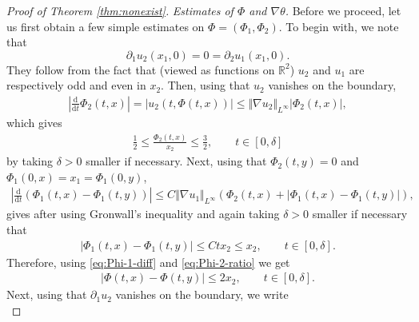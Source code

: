 \documentclass[10pt]{amsart}
\theoremstyle{definition}
\theoremstyle{remark}
\numberwithin{equation}{section}
\newcommand{\nrm}[1]{\Vert#1\Vert}
\newcommand{\ud}{\mathrm{d}}
\newcommand{\rd}{\partial}
\newcommand{\nb}{\nabla}
\newcommand{\0}{\emptyset}
\newcommand{\dlt}{\delta}
\newcommand{\tht}{\theta}
\newcommand{\bbR}{\mathbb R}
\begin{document}
\begin{proof}[Proof of Theorem \ref{thm:nonexist}]
			\noindent \textit{Estimates of $\Phi$ and $\nb\tht$.} Before we proceed, let us first obtain a few simple estimates on $\Phi = (\Phi_1,\Phi_2)$. To begin with, we note that $$\partial_1u_2 (x_1,0) = 0 = \partial_2 u_1(x_1,0) .$$ They follow from the fact that (viewed as functions on $\bbR^{2}$) $u_2$ and $u_1$ are respectively odd and even in $x_{2}$. Then, using that $u_{2}$ vanishes on the boundary, \begin{equation*}
				\begin{split}
					\left| \frac{\ud}{\ud t} \Phi_{2}(t,x) \right| = \left| u_{2}(t,\Phi(t,x)) \right| \le \nrm{\nb u_{2}}_{L^\infty} \left| \Phi_{2}(t,x) \right|,
				\end{split}
			\end{equation*} which gives \begin{equation}\label{eq:Phi-2-ratio}
				\begin{split}
					\frac12 \le \frac{\Phi_{2}(t,x)}{x_{2}} \le \frac32 , \qquad t \in [0,\dlt]
				\end{split}
			\end{equation} by taking $\dlt > 0 $ smaller if necessary. Next, using that $\Phi_{2}(t,y) = 0$ and $\Phi_{1}(0,x) = x_{1} = \Phi_{1}(0,y)$, \begin{equation*}
				\begin{split}
					\left| \frac{\ud}{\ud t} \left(\Phi_{1}(t,x) - \Phi_{1}(t,y) \right) \right| \le C\nrm{\nb u_{1}}_{L^\infty} \left(  \Phi_{2}(t,x) + \left|\Phi_{1}(t,x) - \Phi_{1}(t,y)\right| \right), 
				\end{split}
			\end{equation*} gives after using Gronwall's inequality and again taking $\dlt > 0 $ smaller if necessary that \begin{equation}\label{eq:Phi-1-diff}
				\begin{split}
					\left|\Phi_{1}(t,x) - \Phi_{1}(t,y)\right| \le Ctx_{2} \le x_{2}, \qquad t \in [0,\dlt]. 
				\end{split}
			\end{equation} Therefore, using \eqref{eq:Phi-1-diff} and \eqref{eq:Phi-2-ratio} we get \begin{equation}\label{eq:Phi-diff}
				\begin{split}
					\left|\Phi(t,x) - \Phi(t,y)\right| \le 2x_{2} , \qquad t \in [0,\dlt]. 
				\end{split}
			\end{equation} 
			Next, using that $\rd_1u_2$ vanishes on the boundary, we write 
			\begin{equation}

\end{equation}
\end{proof}
\end{document}
